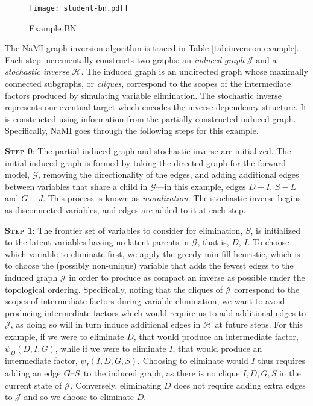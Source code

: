 \begin{wrapfigure}[8]{r}{0.26\textwidth}
  \vspace*{-2ex}
	\centering
	\texttt{[image: student-bn.pdf]}
	\caption{Example BN}
  \label{fig:student-bn}
\end{wrapfigure}
The NaMI graph-inversion algorithm is traced in Table \ref{tab:inversion-example}.
Each step incrementally constructs two graphs:
an \emph{induced graph} $\mathcal{J}$ and a \emph{stochastic inverse} $\mathcal{H}$.
The induced graph is an undirected graph whose maximally connected subgraphs, or \emph{cliques}, correspond to the scopes of the intermediate factors produced by simulating variable elimination.
The stochastic inverse represents our eventual target which encodes the inverse dependency structure.  It is constructed using information from the partially-constructed induced graph.
Specifically, NaMI goes through the following steps for this example.

\textbf{{\scshape Step 0}}: The partial induced graph and stochastic inverse are initialized.
The initial induced graph is formed by taking the directed graph for the forward model, $\mathcal{G}$, removing the directionality of the edges, and adding additional edges between variables that share a child in $\mathcal{G}$---in this example, edges $D-I$, $S-L$ and $G-J$.
This process is known as \emph{moralization}.
The stochastic inverse begins as disconnected variables, and edges are added to it at each step.


\textbf{{\scshape Step 1}}: The frontier set of variables to consider for elimination, $S$, is initialized to the latent variables having no latent parents in $\mathcal{G}$, that is, $D$, $I$.
To choose which variable to eliminate first, we apply the greedy min-fill heuristic, which is to choose the (possibly non-unique) variable that adds the fewest edges to the induced graph $\mathcal{J}$ in order to produce as compact an inverse as possible under the topological ordering.
Specifically, noting that the cliques of $\mathcal{J}$ correspond to the scopes of intermediate factors during variable elimination, we want to avoid producing intermediate factors which would require us to add additional edges to $\mathcal{J}$, as doing so will in turn induce additional edges in $\mathcal{H}$ at future steps.
For this example, if we were to eliminate $D$, that would produce an intermediate factor, $\psi_D(D,I,G)$, while if we were to eliminate $I$, that would produce an intermediate factor, $\psi_I(I,D,G,S)$.
Choosing to eliminate would $I$ thus requires adding an edge $G\hbox{--}S$ to the induced graph, as there is no clique $I,D,G,S$ in the current state of $\mathcal{J}$.
Conversely, eliminating $D$ does not require adding extra edges to $\mathcal{J}$ and so we choose to eliminate $D$.

